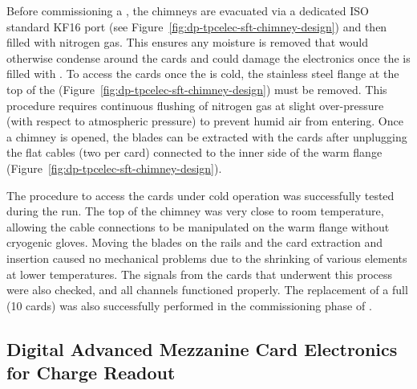 Before commissioning a , the chimneys are evacuated via a dedicated ISO standard KF16 port (see Figure~\ref{fig:dp-tpcelec-sft-chimney-design}) and then filled with nitrogen gas. This ensures any moisture is removed that would otherwise condense around the  cards and %
could damage the electronics once the  is filled with . To access the  cards once the  is cold, the stainless steel flange at the top of the  (Figure~\ref{fig:dp-tpcelec-sft-chimney-design}) must be removed. This procedure requires continuous flushing of nitrogen gas at slight over-pressure (with respect to atmospheric pressure) to prevent humid air from  entering. Once a chimney is opened, the blades can be extracted with the  cards after unplugging the flat cables (two per card) connected to the inner side of the warm flange (Figure~\ref{fig:dp-tpcelec-sft-chimney-design}).

The procedure to access the  cards under cold operation was successfully tested during the   run. The top of the chimney was very close to room temperature, allowing the cable connections to be manipulated on the warm \fdth flange without cryogenic gloves. Moving the blades on the rails and the  card extraction and insertion caused no mechanical problems due to the shrinking of various elements at lower temperatures.  The signals from the  cards that underwent this process were also checked, and all channels functioned properly. The replacement of a full  (\num{10}  cards) was also successfully performed in the commissioning phase of . 


\subsection{Digital Advanced Mezzanine Card Electronics for Charge Readout}
\label{ssec:dp-tpcelec-design-amc}

